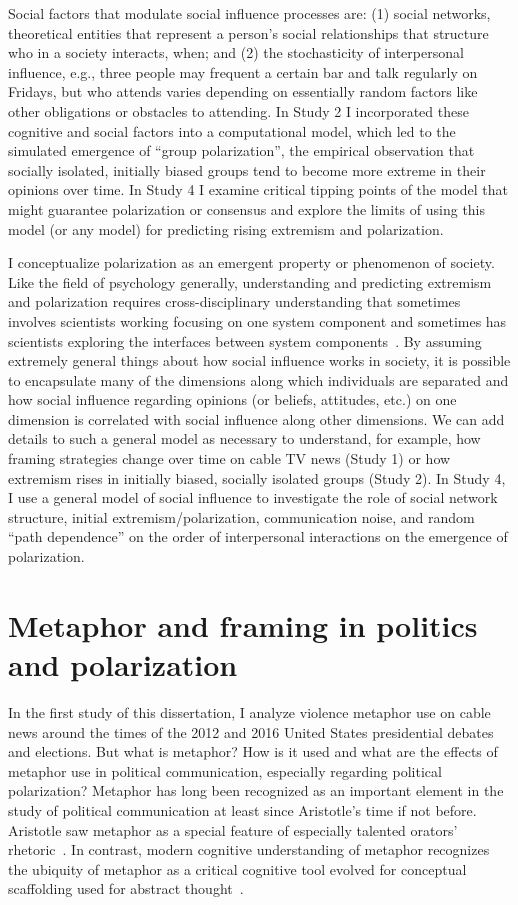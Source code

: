 Social factors that modulate social influence processes are: (1) social
networks, theoretical entities that represent a person's social relationships
that structure who in a society interacts, when; and (2) the stochasticity
of interpersonal influence, e.g., three people may frequent a certain bar
and talk regularly on Fridays, but who attends varies depending on essentially
random factors like other obligations or obstacles to attending. 
In Study 2 I incorporated these cognitive and social factors into a 
computational model, which led to the simulated emergence of 
``group polarization'', the empirical 
observation that socially isolated, initially biased groups tend to become
more extreme in their opinions over time. In Study 4 I examine critical
tipping points of the model that might guarantee polarization or consensus and
explore the limits of using this model (or any model) for predicting 
rising extremism and polarization.

I conceptualize polarization as an emergent property or phenomenon of society. 
Like the field of psychology generally, understanding and predicting extremism
and polarization requires cross-disciplinary understanding that sometimes
involves scientists working focusing on one system component and sometimes has 
scientists exploring the interfaces between system components~\cite{Brewer2013,Rollwage2019}.
By assuming extremely general things about how social influence works in society, it is
possible to encapsulate many of the dimensions along which individuals are
separated and how social influence regarding opinions (or beliefs, attitudes, etc.) on one dimension
is correlated with social influence along other dimensions. We can add 
details to such a general model as necessary to understand, for example, 
how framing strategies change over time on cable TV news (Study 1) or how
extremism rises in initially biased, socially isolated groups (Study 2). 
In Study 4, I use a general model of social influence to 
investigate the role of social network structure, initial extremism/polarization,
communication noise, and random ``path dependence'' on the order of 
interpersonal interactions on the emergence of polarization.


\section{Metaphor and framing in politics and polarization}

In the first study of this dissertation, I analyze violence metaphor use on
cable news around the times of the 2012 and 2016 United States presidential
debates and elections. But what is metaphor? How is it used and what are the
effects of metaphor use in political communication, especially regarding
political polarization? Metaphor has long been recognized as an important 
element in the study of political 
communication at least since Aristotle's time if not before.
Aristotle saw metaphor as a special 
feature of especially talented orators' rhetoric~\cite{Aristotle1965,Kirby1997}. 
In contrast, modern cognitive understanding of metaphor recognizes the
ubiquity of metaphor as a critical cognitive tool evolved for 
conceptual scaffolding used for abstract 
thought~\cite{Lakoff1980,Heyes2018a,HeyesCognitiveGadgets}.  

